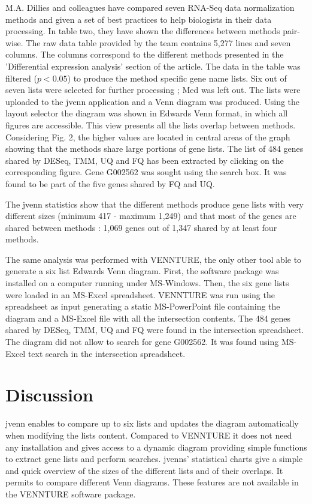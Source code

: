 \documentclass{bmcart}
\begin{document}
M.A. Dillies and colleagues \cite{Dillies2012} have compared seven RNA-Seq data
normalization methods and given a set of best practices to help biologists in their 
data processing. In table two, they have shown the differences between methods
pair-wise. The raw data table provided by the team contains 5,277 lines and
seven columns. The columns correspond to  the different methods presented in the
'Differential expression analysis' section of the article. The data in the table
was filtered ($p < 0.05$) to produce the method specific gene name lists. Six
out of seven lists were selected for further processing ; Med was left out.
The lists were uploaded to the jvenn application and a Venn diagram was
produced. Using the layout selector the diagram was shown in Edwards Venn
format, in which all figures are accessible. This view presents all the lists
overlap between methods. Considering Fig. 2, the higher values are located in
central areas of the graph showing that the methods share large portions of gene
lists. The list of 484 genes shared by DESeq, TMM, UQ and FQ has been extracted
by clicking on the corresponding figure. Gene G002562 was sought using the
search box. It was found to be part of the five genes shared by FQ and UQ. 

The jvenn statistics show that the different methods produce gene lists with
very different sizes (minimum 417 - maximum 1,249) and that most of the genes are
shared between methods : 1,069 genes out of 1,347 shared by at least four methods.

The same analysis was performed with VENNTURE, the only other tool able to
generate a six list Edwards Venn diagram. First, the software package was
installed on a computer running under MS-Windows. Then, the six gene lists were loaded
in an MS-Excel spreadsheet. VENNTURE was run using the spreadsheet as input
generating a static MS-PowerPoint file containing the diagram and a MS-Excel
file with all the intersection contents. The 484 genes shared by DESeq,
TMM, UQ and FQ  were found in the intersection spreadsheet. The diagram did not
allow to search for gene G002562. It was found using MS-Excel text search in the 
intersection spreadsheet.

\section*{Discussion}

jvenn enables to compare up to six lists and updates the diagram automatically
when modifying the lists content. Compared to VENNTURE it does not need any
installation and gives access to a dynamic diagram providing simple functions to
extract gene lists and perform searches. 
jvenns' statistical charts give a simple and quick overview of the sizes of the
different lists and of their overlaps. It permits to compare different Venn diagrams.
These features are not available in the VENNTURE software package.
\end{document}
